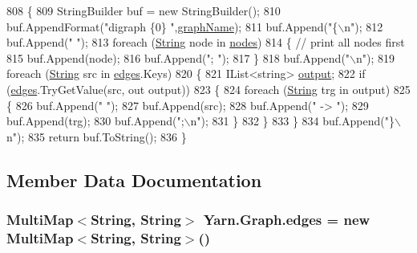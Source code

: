 \begin{DoxyCode}
808         \{
809             StringBuilder buf = \textcolor{keyword}{new} StringBuilder();
810             buf.AppendFormat(\textcolor{stringliteral}{"digraph \{0\} "},\hyperlink{a00108_a8605f1ec5a4e9cfd07d3ac2be042dac6}{graphName});
811             buf.Append(\textcolor{stringliteral}{"\{\(\backslash\)n"});
812             buf.Append(\textcolor{stringliteral}{"  "});
813             \textcolor{keywordflow}{foreach} (\hyperlink{a00051_a301aa7c866593a5b625a8fc158bbeacea27118326006d3829667a400ad23d5d98}{String} node \textcolor{keywordflow}{in} \hyperlink{a00108_a506df6f737a41748c01239bdea5d82b1}{nodes})
814             \{ \textcolor{comment}{// print all nodes first}
815                 buf.Append(node);
816                 buf.Append(\textcolor{stringliteral}{"; "});
817             \}
818             buf.Append(\textcolor{stringliteral}{"\(\backslash\)n"});
819             \textcolor{keywordflow}{foreach} (\hyperlink{a00051_a301aa7c866593a5b625a8fc158bbeacea27118326006d3829667a400ad23d5d98}{String} src \textcolor{keywordflow}{in} \hyperlink{a00108_a8adf7c937ab5c584b49698283e3da150}{edges}.Keys)
820             \{
821                 IList<string> \hyperlink{a00348_a3da6d48778c7b08a040bf24377f67792}{output};
822                 \textcolor{keywordflow}{if} (\hyperlink{a00108_a8adf7c937ab5c584b49698283e3da150}{edges}.TryGetValue(src, out output))
823                 \{
824                     \textcolor{keywordflow}{foreach} (\hyperlink{a00051_a301aa7c866593a5b625a8fc158bbeacea27118326006d3829667a400ad23d5d98}{String} trg \textcolor{keywordflow}{in} output)
825                     \{
826                         buf.Append(\textcolor{stringliteral}{"  "});
827                         buf.Append(src);
828                         buf.Append(\textcolor{stringliteral}{" -> "});
829                         buf.Append(trg);
830                         buf.Append(\textcolor{stringliteral}{";\(\backslash\)n"});
831                     \}
832                 \}
833             \}
834             buf.Append(\textcolor{stringliteral}{"\}\(\backslash\)n"});
835             \textcolor{keywordflow}{return} buf.ToString();
836         \}
\end{DoxyCode}


\subsection{Member Data Documentation}
\hypertarget{a00108_a8adf7c937ab5c584b49698283e3da150}{
\subsubsection[{edges}]{\setlength{\rightskip}{0pt plus 5cm}Multi\-Map$<${\bf String}, {\bf String}$>$ Yarn.\-Graph.\-edges = new Multi\-Map$<${\bf String}, {\bf String}$>$()}}\label{a00108_a8adf7c937ab5c584b49698283e3da150}


